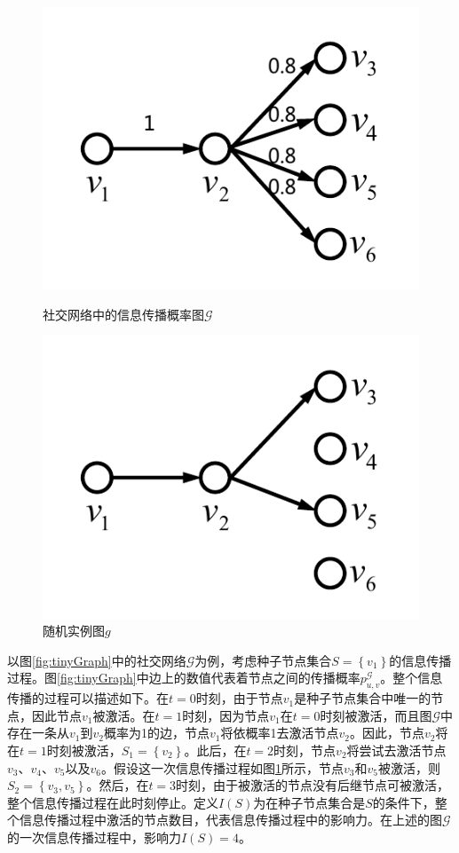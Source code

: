 \begin{figure}[ht]
   \begin{minipage}{0.48\textwidth}
     \centering
     \includegraphics[width=0.8\linewidth]{figures/tinyGraph.pdf}
     \caption{社交网络中的信息传播概率图$\mathcal{G}$}\label{fig:tinyGraph}
   \end{minipage}
   \hfill
   \begin {minipage}{0.48\textwidth}
     \centering
     \includegraphics[width=0.8\linewidth]{figures/tinyRandomGraph.pdf}
     \caption{随机实例图$g$}\label{fig:tinyRandomGraph}
   \end{minipage}
\end{figure}

以图\ref{fig:tinyGraph}中的社交网络$\mathcal{G}$为例，考虑种子节点集合$S=\left\{v_1\right\}$的信息传播过程。图\ref{fig:tinyGraph}中边上的数值代表着节点之间的传播概率$p^\mathcal{G}_{u,v}$。整个信息传播的过程可以描述如下。在$t=0$时刻，由于节点$v_1$是种子节点集合中唯一的节点，因此节点$v_1$被激活。在$t=1$时刻，因为节点$v_1$在$t=0$时刻被激活，而且图$\mathcal{G}$中存在一条从$v_1$到$v_2$概率为1的边，节点$v_1$将依概率1去激活节点$v_2$。因此，节点$v_2$将在$t=1$时刻被激活，$S_1=\left\{v_2\right\}$。此后，在$t=2$时刻，节点$v_2$将尝试去激活节点$v_3$、$v_4$、$v_5$以及$v_6$。假设这一次信息传播过程如图\ref{fig:tinyRandomGraph}所示，节点$v_3$和$v_5$被激活，则$S_2=\left\{v_3, v_5\right\}$。然后，在$t=3$时刻，由于被激活的节点没有后继节点可被激活，整个信息传播过程在此时刻停止。定义$I\left(S\right)$为在种子节点集合是$S$的条件下，整个信息传播过程中激活的节点数目，代表信息传播过程中的影响力。在上述的图$\mathcal{G}$的一次信息传播过程中，影响力$I\left(S\right)=4$。

